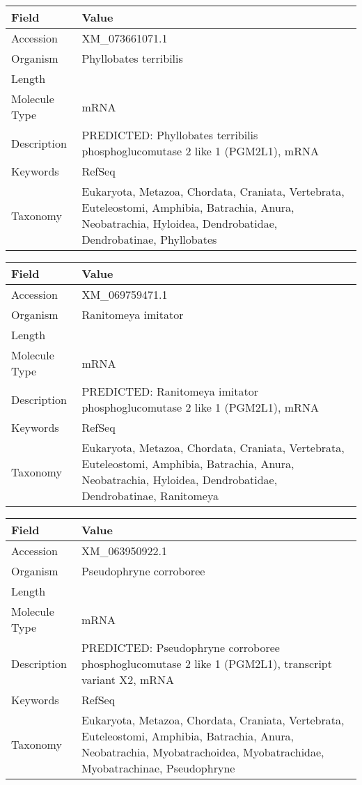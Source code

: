 \documentclass[10pt]{article}
\begin{document}
\vspace{1em}
{\footnotesize
\begin{longtable}{>{\raggedright\arraybackslash}p{4.5cm} >{\raggedright\arraybackslash}p{11.5cm}}
\textbf{Field} & \textbf{Value} \\
\hline
Accession & XM\_073661071.1 \\
Organism & Phyllobates terribilis \\
Length & 4305 \\
Molecule Type & mRNA \\
Description & PREDICTED: Phyllobates terribilis phosphoglucomutase 2 like 1 (PGM2L1), mRNA \\
Keywords & RefSeq \\
Taxonomy & Eukaryota, Metazoa, Chordata, Craniata, Vertebrata, Euteleostomi, Amphibia, Batrachia, Anura, Neobatrachia, Hyloidea, Dendrobatidae, Dendrobatinae, Phyllobates \\
\end{longtable}
}

\vspace{1em}
{\footnotesize
\begin{longtable}{>{\raggedright\arraybackslash}p{4.5cm} >{\raggedright\arraybackslash}p{11.5cm}}
\textbf{Field} & \textbf{Value} \\
\hline
Accession & XM\_069759471.1 \\
Organism & Ranitomeya imitator \\
Length & 6282 \\
Molecule Type & mRNA \\
Description & PREDICTED: Ranitomeya imitator phosphoglucomutase 2 like 1 (PGM2L1), mRNA \\
Keywords & RefSeq \\
Taxonomy & Eukaryota, Metazoa, Chordata, Craniata, Vertebrata, Euteleostomi, Amphibia, Batrachia, Anura, Neobatrachia, Hyloidea, Dendrobatidae, Dendrobatinae, Ranitomeya \\
\end{longtable}
}

\vspace{1em}
{\footnotesize
\begin{longtable}{>{\raggedright\arraybackslash}p{4.5cm} >{\raggedright\arraybackslash}p{11.5cm}}
\textbf{Field} & \textbf{Value} \\
\hline
Accession & XM\_063950922.1 \\
Organism & Pseudophryne corroboree \\
Length & 7350 \\
Molecule Type & mRNA \\
Description & PREDICTED: Pseudophryne corroboree phosphoglucomutase 2 like 1 (PGM2L1), transcript variant X2, mRNA \\
Keywords & RefSeq \\
Taxonomy & Eukaryota, Metazoa, Chordata, Craniata, Vertebrata, Euteleostomi, Amphibia, Batrachia, Anura, Neobatrachia, Myobatrachoidea, Myobatrachidae, Myobatrachinae, Pseudophryne \\
\end{longtable}
}
\end{document}
